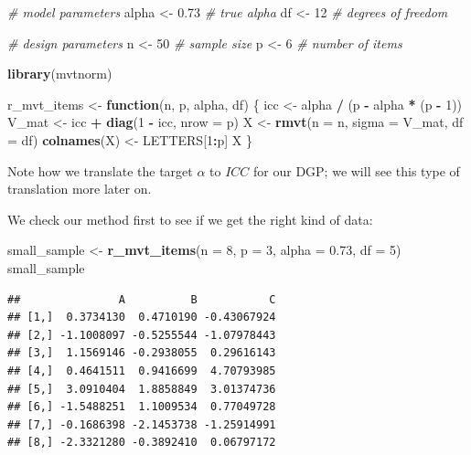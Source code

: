 \documentclass[
]{book}
\newenvironment{Shaded}{\begin{snugshade}}{\end{snugshade}}
\newcommand{\AttributeTok}[1]{\textcolor[rgb]{0.13,0.29,0.53}{#1}}
\newcommand{\CommentTok}[1]{\textcolor[rgb]{0.56,0.35,0.01}{\textit{#1}}}
\newcommand{\ControlFlowTok}[1]{\textcolor[rgb]{0.13,0.29,0.53}{\textbf{#1}}}
\newcommand{\DecValTok}[1]{\textcolor[rgb]{0.00,0.00,0.81}{#1}}
\newcommand{\FloatTok}[1]{\textcolor[rgb]{0.00,0.00,0.81}{#1}}
\newcommand{\FunctionTok}[1]{\textcolor[rgb]{0.13,0.29,0.53}{\textbf{#1}}}
\newcommand{\NormalTok}[1]{#1}
\newcommand{\OtherTok}[1]{\textcolor[rgb]{0.56,0.35,0.01}{#1}}
\newcommand{\SpecialCharTok}[1]{\textcolor[rgb]{0.81,0.36,0.00}{\textbf{#1}}}
\begin{document}
\begin{Shaded}
\begin{Highlighting}[]
\CommentTok{\# model parameters}
\NormalTok{alpha }\OtherTok{\textless{}{-}} \FloatTok{0.73} \CommentTok{\# true alpha}
\NormalTok{df }\OtherTok{\textless{}{-}} \DecValTok{12} \CommentTok{\# degrees of freedom}

\CommentTok{\# design parameters}
\NormalTok{n }\OtherTok{\textless{}{-}} \DecValTok{50} \CommentTok{\# sample size}
\NormalTok{p }\OtherTok{\textless{}{-}} \DecValTok{6} \CommentTok{\# number of items}


\FunctionTok{library}\NormalTok{(mvtnorm)}

\NormalTok{r\_mvt\_items }\OtherTok{\textless{}{-}} \ControlFlowTok{function}\NormalTok{(n, p, alpha, df) \{}
\NormalTok{  icc }\OtherTok{\textless{}{-}}\NormalTok{ alpha }\SpecialCharTok{/}\NormalTok{ (p }\SpecialCharTok{{-}}\NormalTok{ alpha }\SpecialCharTok{*}\NormalTok{ (p }\SpecialCharTok{{-}} \DecValTok{1}\NormalTok{))}
\NormalTok{  V\_mat }\OtherTok{\textless{}{-}}\NormalTok{ icc }\SpecialCharTok{+} \FunctionTok{diag}\NormalTok{(}\DecValTok{1} \SpecialCharTok{{-}}\NormalTok{ icc, }\AttributeTok{nrow =}\NormalTok{ p)}
\NormalTok{  X }\OtherTok{\textless{}{-}} \FunctionTok{rmvt}\NormalTok{(}\AttributeTok{n =}\NormalTok{ n, }\AttributeTok{sigma =}\NormalTok{ V\_mat, }\AttributeTok{df =}\NormalTok{ df)}
  \FunctionTok{colnames}\NormalTok{(X) }\OtherTok{\textless{}{-}}\NormalTok{ LETTERS[}\DecValTok{1}\SpecialCharTok{:}\NormalTok{p]}
\NormalTok{  X}
\NormalTok{\}}
\end{Highlighting}
\end{Shaded}

Note how we translate the target \(\alpha\) to \(ICC\) for our DGP; we will see this type of translation more later on.

We check our method first to see if we get the right kind of data:

\begin{Shaded}
\begin{Highlighting}[]
\NormalTok{small\_sample }\OtherTok{\textless{}{-}} \FunctionTok{r\_mvt\_items}\NormalTok{(}\AttributeTok{n =} \DecValTok{8}\NormalTok{, }\AttributeTok{p =} \DecValTok{3}\NormalTok{, }\AttributeTok{alpha =} \FloatTok{0.73}\NormalTok{, }\AttributeTok{df =} \DecValTok{5}\NormalTok{)}
\NormalTok{small\_sample}
\end{Highlighting}
\end{Shaded}

\begin{verbatim}
##               A          B           C
## [1,]  0.3734130  0.4710190 -0.43067924
## [2,] -1.1008097 -0.5255544 -1.07978443
## [3,]  1.1569146 -0.2938055  0.29616143
## [4,]  0.4641511  0.9416699  4.70793985
## [5,]  3.0910404  1.8858849  3.01374736
## [6,] -1.5488251  1.1009534  0.77049728
## [7,] -0.1686398 -2.1453738 -1.25914991
## [8,] -2.3321280 -0.3892410  0.06797172
\end{verbatim}
\end{document}
